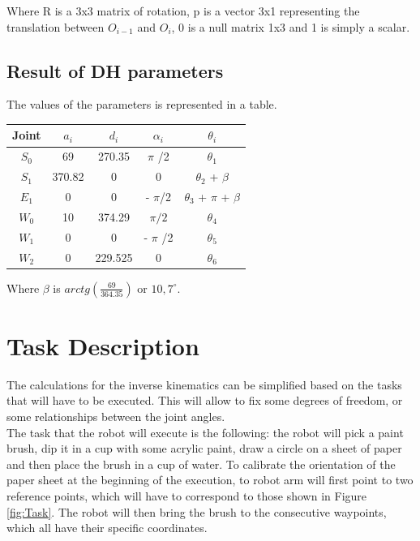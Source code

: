 Where R is a 3x3 matrix of rotation, p is a vector 3x1 representing the translation between $O_{i-1}$ and $O_i$, 0 is a null matrix 1x3 and 1 is simply a scalar.

\subsection{Result of DH parameters}

The values of the parameters is represented in a table.\\

\begin{center}
	\begin{tabular}{c|c c c c }

		Joint & $a_i$ & $d_i$ & $\alpha_i$  & $\theta_i$ \\
        \hline
        $S_0$ & 69 & 270.35 & $\pi$ /2 & $\theta_1$ \\
        $S_1$ & 370.82 & 0 & 0 & $\theta_2$ + $\beta$\\
        $E_1$ & 0 & 0 & - $\pi$/2 & $\theta_3$ + $\pi$ + $\beta$\\
        $W_0$ & 10 & 374.29 & $\pi/2$ & $\theta_4$\\
        $W_1$ & 0 & 0 & - $\pi$ /2 & $\theta_5$ \\
        $W_2$ & 0 & 229.525 & 0 & $\theta_6$
	\end{tabular}
\end{center}

Where $\beta$ is $arctg(\frac{69}{364.35})$ or $10,7^\circ$.


\section{Task Description}
The calculations for the inverse kinematics can be simplified based on the tasks that will have to be executed. This will allow to fix some degrees of freedom, or some relationships between the joint angles.\\
\noindent The task that the robot will execute is the following: the robot will pick a paint brush, dip it in a cup with some acrylic paint, draw a circle on a sheet of paper and then place the brush in a cup of water. To calibrate the orientation of the paper sheet at the beginning of the execution, to robot arm will first point to two reference points, which will have to correspond to those shown in Figure \ref{fig:Task}. The robot will then bring the brush to the consecutive waypoints, which all have their specific coordinates.


